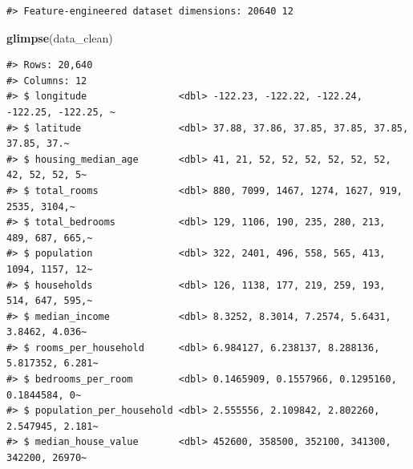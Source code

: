 \documentclass[
]{article}
\newenvironment{Shaded}{\begin{snugshade}}{\end{snugshade}}
\newcommand{\FunctionTok}[1]{\textcolor[rgb]{0.13,0.29,0.53}{\textbf{#1}}}
\newcommand{\NormalTok}[1]{#1}
\begin{document}
\begin{verbatim}
#> Feature-engineered dataset dimensions: 20640 12
\end{verbatim}

\begin{Shaded}
\begin{Highlighting}[]
\FunctionTok{glimpse}\NormalTok{(data\_clean)}
\end{Highlighting}
\end{Shaded}

\begin{verbatim}
#> Rows: 20,640
#> Columns: 12
#> $ longitude                <dbl> -122.23, -122.22, -122.24, -122.25, -122.25, ~
#> $ latitude                 <dbl> 37.88, 37.86, 37.85, 37.85, 37.85, 37.85, 37.~
#> $ housing_median_age       <dbl> 41, 21, 52, 52, 52, 52, 52, 52, 42, 52, 52, 5~
#> $ total_rooms              <dbl> 880, 7099, 1467, 1274, 1627, 919, 2535, 3104,~
#> $ total_bedrooms           <dbl> 129, 1106, 190, 235, 280, 213, 489, 687, 665,~
#> $ population               <dbl> 322, 2401, 496, 558, 565, 413, 1094, 1157, 12~
#> $ households               <dbl> 126, 1138, 177, 219, 259, 193, 514, 647, 595,~
#> $ median_income            <dbl> 8.3252, 8.3014, 7.2574, 5.6431, 3.8462, 4.036~
#> $ rooms_per_household      <dbl> 6.984127, 6.238137, 8.288136, 5.817352, 6.281~
#> $ bedrooms_per_room        <dbl> 0.1465909, 0.1557966, 0.1295160, 0.1844584, 0~
#> $ population_per_household <dbl> 2.555556, 2.109842, 2.802260, 2.547945, 2.181~
#> $ median_house_value       <dbl> 452600, 358500, 352100, 341300, 342200, 26970~
\end{verbatim}
\end{document}
